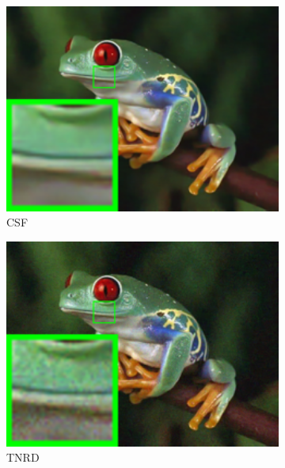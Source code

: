 \begin{figure}
\begin{subfigure}[t]{0.19\textwidth}
        \includegraphics[width=1\textwidth]{images/guided/nc/resize_br_CSF_frog.png}
\caption{CSF}
    \end{subfigure}
\hfill
    \begin{subfigure}[t]{0.19\textwidth}
        \centering
        \includegraphics[width=1\textwidth]{images/guided/nc/resize_br_TRD_frog.png}
		\caption{TNRD}
    \end{subfigure}
    \hfill
    \begin{subfigure}[t]{0.19\textwidth}
        \centering

\end{subfigure}
\end{figure}
